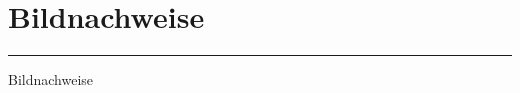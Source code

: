 

\newpage
\section{Bildnachweise}
\noindent\rule{\linewidth}{0.4pt}

\begin{small}Bildnachweise\end{small}

\vspace{0.22cm}
\begin{tiny}
 
\end{tiny}
